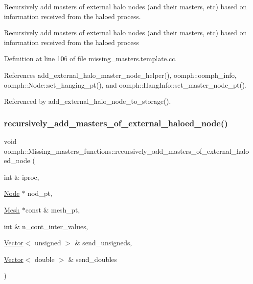 Recursively add masters of external halo nodes (and their masters, etc) based on information received from the haloed process. 

Recursively add masters of external halo nodes (and their masters, etc) based on information received from the haloed process 

Definition at line 106 of file missing\+\_\+masters.\+template.\+cc.



References add\+\_\+external\+\_\+halo\+\_\+master\+\_\+node\+\_\+helper(), oomph\+::oomph\+\_\+info, oomph\+::\+Node\+::set\+\_\+hanging\+\_\+pt(), and oomph\+::\+Hang\+Info\+::set\+\_\+master\+\_\+node\+\_\+pt().



Referenced by add\+\_\+external\+\_\+halo\+\_\+node\+\_\+to\+\_\+storage().

\mbox{\label{namespaceoomph_1_1Missing__masters__functions_a954b632d3a93388358723d33bca9c549}} 
\subsubsection{\texorpdfstring{recursively\+\_\+add\+\_\+masters\+\_\+of\+\_\+external\+\_\+haloed\+\_\+node()}{recursively\_add\_masters\_of\_external\_haloed\_node()}}
{\footnotesize\ttfamily void oomph\+::\+Missing\+\_\+masters\+\_\+functions\+::recursively\+\_\+add\+\_\+masters\+\_\+of\+\_\+external\+\_\+haloed\+\_\+node (\begin{DoxyParamCaption}\item[{int \&}]{iproc,  }\item[{\hyperlink{classoomph_1_1Node}{Node} $\ast$}]{nod\+\_\+pt,  }\item[{\hyperlink{classoomph_1_1Mesh}{Mesh} $\ast$const \&}]{mesh\+\_\+pt,  }\item[{int \&}]{n\+\_\+cont\+\_\+inter\+\_\+values,  }\item[{\hyperlink{classoomph_1_1Vector}{Vector}$<$ unsigned $>$ \&}]{send\+\_\+unsigneds,  }\item[{\hyperlink{classoomph_1_1Vector}{Vector}$<$ double $>$ \&}]{send\+\_\+doubles }\end{DoxyParamCaption})}




